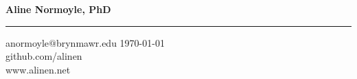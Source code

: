 {\Large {\bf Aline Normoyle, PhD}}
\hrule
anormoyle$@$brynmawr.edu \hfill \today \\
github.com/alinen\\
\textcolor{Periwinkle}{www.alinen.net}\\